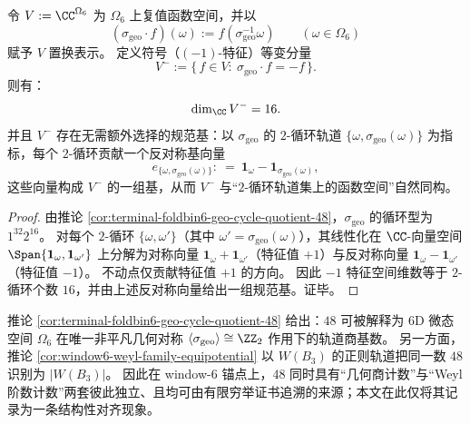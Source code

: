 \begin{theorem}\label{thm:terminal-foldbin6-geo-sign-antiinvariant-16}
令 \(V:=\CC^{\Omega_6}\) 为 \(\Omega_6\) 上复值函数空间，并以
\[
(\sigma_{\mathrm{geo}}\cdot f)(\omega):=f(\sigma_{\mathrm{geo}}^{-1}\omega)
\qquad(\omega\in\Omega_6)
\]
赋予 \(V\) 置换表示。
定义符号（\((-1)\)-特征）等变分量
\[
V^{-}:=\{\,f\in V:\ \sigma_{\mathrm{geo}}\cdot f=-f\,\}.
\]
则有：
\[
\dim_{\CC} V^{-}=16.
\]
并且 \(V^{-}\) 存在无需额外选择的规范基：以 \(\sigma_{\mathrm{geo}}\) 的 \(2\)-循环轨道 \(\{\omega,\sigma_{\mathrm{geo}}(\omega)\}\) 为指标，每个 \(2\)-循环贡献一个反对称基向量
\[
e_{\{\omega,\sigma_{\mathrm{geo}}(\omega)\}}
:\ =\ \mathbf 1_{\omega}-\mathbf 1_{\sigma_{\mathrm{geo}}(\omega)},
\]
这些向量构成 \(V^{-}\) 的一组基，从而 \(V^{-}\) 与“\(2\)-循环轨道集上的函数空间”自然同构。
\end{theorem}

\begin{proof}
由推论 \ref{cor:terminal-foldbin6-geo-cycle-quotient-48}，\(\sigma_{\mathrm{geo}}\) 的循环型为 \(1^{32}2^{16}\)。
对每个 \(2\)-循环 \(\{\omega,\omega'\}\)（其中 \(\omega'=\sigma_{\mathrm{geo}}(\omega)\)），其线性化在 \(\CC\)-向量空间 \(\Span\{\mathbf 1_\omega,\mathbf 1_{\omega'}\}\) 上分解为对称向量 \(\mathbf 1_\omega+\mathbf 1_{\omega'}\)（特征值 \(+1\)）与反对称向量 \(\mathbf 1_\omega-\mathbf 1_{\omega'}\)（特征值 \(-1\)）。
不动点仅贡献特征值 \(+1\) 的方向。
因此 \(-1\) 特征空间维数等于 \(2\)-循环个数 \(16\)，并由上述反对称向量给出一组规范基。证毕。
\end{proof}



\begin{remark}\label{rem:terminal-foldbin6-geo-quotient-weyl-shadow}
推论 \ref{cor:terminal-foldbin6-geo-cycle-quotient-48} 给出：\(48\) 可被解释为 6D 微态空间 \(\Omega_6\) 在唯一非平凡几何对称 \(\langle\sigma_{\mathrm{geo}}\rangle\cong\ZZ_2\) 作用下的轨道商基数。
另一方面，推论 \ref{cor:window6-weyl-family-equipotential} 以 \(W(B_3)\) 的正则轨道把同一数 \(48\) 识别为 \(|W(B_3)|\)。
因此在 window-\(6\) 锚点上，\(48\) 同时具有“几何商计数”与“Weyl 阶数计数”两套彼此独立、且均可由有限穷举证书追溯的来源；本文在此仅将其记录为一条结构性对齐现象。
\end{remark}


